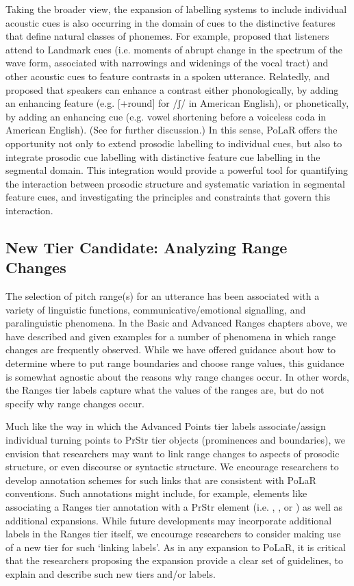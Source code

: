 Taking the broader view,  the expansion of labelling systems to include individual acoustic cues is also occurring in the domain of cues to the distinctive features that define natural classes of phonemes.  For example, \citet{stevens02} proposed that listeners attend to Landmark cues (i.e. moments of abrupt change in the spectrum of the wave form, associated with narrowings and widenings of the vocal tract) and other acoustic cues to feature contrasts in a spoken utterance.  Relatedly, \citet{stevenskeyser89} and \citet{keyserstevens01} proposed that speakers can enhance a contrast either phonologically, by adding an enhancing feature (e.g. [+round] for /ʃ/ in American English), or phonetically, by adding an enhancing cue (e.g. vowel shortening before a voiceless coda in American English).  (See \citealt{clements09} for further discussion.)   In this sense, PoLaR offers the opportunity not only to extend prosodic labelling to individual cues, but also to integrate prosodic cue labelling with distinctive feature cue labelling in the segmental domain.  This integration would provide a powerful tool for quantifying the interaction between prosodic structure and systematic variation in segmental feature cues, and investigating the principles and constraints that govern this interaction.  

\subsection{New Tier Candidate: Analyzing Range Changes}\label{sec:new-tier-range-changes}
The selection of pitch range(s) for an utterance has been associated with a variety of linguistic functions, communicative\slash emotional signalling, and paralinguistic phenomena. In the Basic and Advanced Ranges chapters above, we have described and given examples for a number of phenomena in which range changes are frequently observed.  While we have offered guidance about how to determine where to put range boundaries and choose range values, this guidance is somewhat agnostic about the reasons why range changes occur. In other words, the Ranges tier labels capture what the values of the ranges are, but do not specify why range changes occur. 

Much like the way in which the Advanced Points tier labels associate\slash assign individual turning points to PrStr tier objects (prominences and boundaries), we envision that researchers may want to link range changes to aspects of prosodic structure, or even discourse or syntactic structure. We encourage researchers to develop annotation schemes for such links that are consistent with PoLaR conventions. Such annotations might include, for example, elements like associating a Ranges tier annotation with a PrStr element (i.e. \textlabel{*}, \textlabel{[}, or \textlabel{]}) as well as additional expansions. While future developments may incorporate additional labels in the Ranges tier itself, we encourage researchers to consider making use of a new tier for such ‘linking labels’. As in any expansion to PoLaR, it is critical that the researchers proposing the expansion provide a clear set of guidelines, to explain and describe such new tiers and/or labels.

